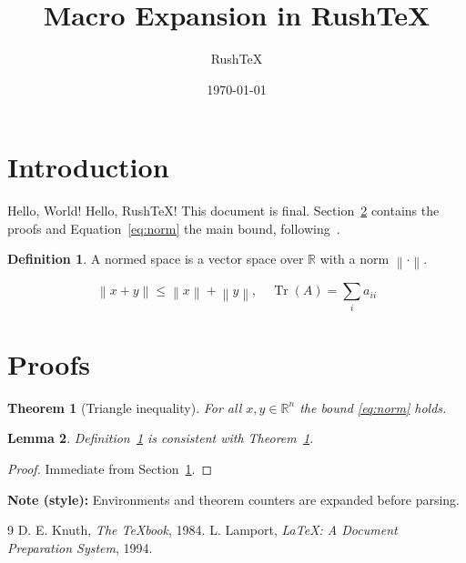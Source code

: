 \documentclass[11pt]{article}
\title{Macro Expansion in RushTeX}
\author{RushTeX}
\date{\today}
\newcommand{\R}{\mathbb{R}}
\newcommand{\norm}[1]{\left\| #1 \right\|}
\newcommand{\greet}[1][World]{Hello, #1!}
\DeclareMathOperator{\Tr}{Tr}
\newif\ifdraft
\newtheorem{theorem}{Theorem}[section]
\newtheorem{lemma}[theorem]{Lemma}
\theoremstyle{definition}
\newtheorem{definition}{Definition}
\newenvironment{note}[1]{\noindent\textbf{Note (#1):} }{\par}
\begin{document}
\maketitle

\section{Introduction}\label{sec:intro}
\greet{} \greet[RushTeX] This document is \ifdraft a draft\else final\fi.
Section~\ref{sec:proofs} contains the proofs and Equation~\eqref{eq:norm} the main bound,
following~\cite{knuth,lamport}.

\begin{definition}\label{def:space}
A normed space is a vector space over $\R$ with a norm $\norm{\cdot}$.
\end{definition}

\begin{equation}\label{eq:norm}
\norm{x + y} \le \norm{x} + \norm{y}, \quad \Tr(A) = \sum_i a_{ii}
\end{equation}

\section{Proofs}\label{sec:proofs}
\begin{theorem}[Triangle inequality]\label{thm:tri}
For all $x, y \in \R^n$ the bound \eqref{eq:norm} holds.
\end{theorem}

\begin{lemma}
Definition~\ref{def:space} is consistent with Theorem~\ref{thm:tri}.
\end{lemma}

\begin{proof}
Immediate from Section~\ref{sec:intro}.
\end{proof}

\begin{note}{style}
Environments and theorem counters are expanded before parsing.
\end{note}

\begin{thebibliography}{9}
 D. E. Knuth, \textit{The TeXbook}, 1984.
 L. Lamport, \textit{LaTeX: A Document Preparation System}, 1994.
\end{thebibliography}
\end{document}
